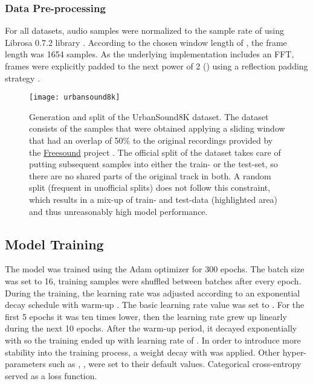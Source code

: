 \documentclass[a4paper,conference]{IEEEtran}
\begin{document}
\subsubsection{Data Pre-processing}
For all datasets, audio samples were normalized to the sample rate of  using Librosa 0.7.2 library \cite{librosa2020}.
According to the chosen window length of , the frame length was 1654 samples.
As the underlying implementation includes an FFT, frames were explicitly padded to the next power of 2 () using a reflection padding strategy \cite{cooley1965fft}.

\begin{figure}[!hbt]
\centering
\texttt{[image: urbansound8k]}
\caption{Generation and split of the UrbanSound8K dataset. The dataset consists of the samples that were obtained applying a sliding window that had an overlap of 50\:\% to the original recordings provided by the \href{https://freesound.org/}{Freesound} project \cite{freesound2013}.
The official split of the dataset takes care of putting subsequent samples into either the train- or the test-set, so there are no shared parts of the original track in both.
A random split (frequent in unofficial splits) does not follow this constraint, which results in a mix-up of train- and test-data (highlighted area) and thus unreasonably high model performance.}
\label{fig:urbansound8k}
\end{figure}

\subsection{Model Training} \label{ssec:model_training}

The model was trained using the Adam \cite{kingma2014adam} optimizer for 300 epochs.
The batch size was set to 16, training samples were shuffled between batches after every epoch.
During the training, the learning rate was adjusted according to an exponential decay schedule with warm-up \cite{goyal2017warmup}.
The basic learning rate value was set to .
For the first 5 epochs it was ten times lower, then the learning rate grew up linearly during the next 10 epochs.
After the warm-up period, it decayed exponentially with  so the training ended up with learning rate of .
In order to introduce more stability into the training process, a weight decay with  \cite{krizhevsky2012alexnet} was applied.
Other hyper-parameters \cite{kingma2014adam} such as , ,  were set to their default values.
Categorical cross-entropy served as a loss function.
\end{document}
